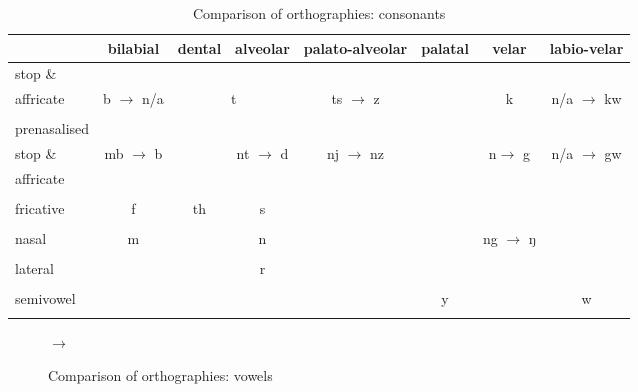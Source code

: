 {\renewcommand{\tabcolsep}{2,3pt}
\begin{table}
\caption{Comparison of orthographies: consonants}
\label{orthogcons}
	\begin{tabularx}{\textwidth}{p{}ccccccc}
		\lsptoprule
		& \scriptsize{bilabial}& \scriptsize{dental} & \scriptsize{alveolar} & \scriptsize{palato-alveolar}	& \scriptsize{palatal} & \scriptsize{velar} & \scriptsize{labio-velar} \\ \midrule
		\scriptsize{stop} \& && \multicolumn{2}{c}{}&&&&\\
		\scriptsize{affricate}	&b $\rightarrow$ n/a& \multicolumn{2}{c}{t}& ts $\rightarrow$ z&& k & n/a $\rightarrow$ kw \\%
		&&&&&&&\\
		\scriptsize{prenasalised} && &&&&&\\
		\scriptsize{stop \&} & mb $\rightarrow$ b & & nt $\rightarrow$ d & nj $\rightarrow$ nz && n\th $\rightarrow$ g & n/a $\rightarrow$ gw\\
		\scriptsize{affricate}&&&&&&&\\%
		&&&&&&&\\
		\scriptsize{fricative} 	& f	& th & s &&&&\\%
		&&&&&&&\\
		\scriptsize{nasal} & m && n &&& ng $\rightarrow$ ŋ & \\%
		&&&&&&&\\
		\scriptsize{lateral} &&& r &&&&\\%
		&&&&&&&\\
		\scriptsize{semivowel} &&&&&y && w\\
		\lspbottomrule
	\end{tabularx}
\end{table}}%

\begin{figure}
\centering
{
\begin{vowel}[simple]
\end{vowel}
} $\longrightarrow$
{
\begin{vowel}[simple]
\end{vowel}
}%
\caption{Comparison of orthographies: vowels} \label{orthogvow}
\end{figure}%